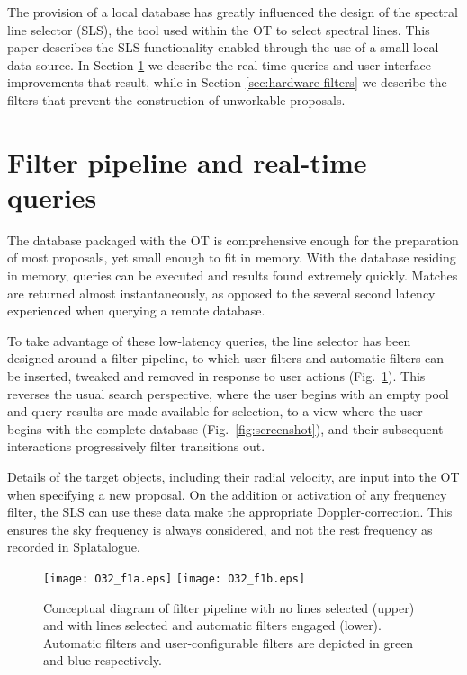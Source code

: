 \documentclass[11pt,twoside]{article}
\begin{document}
The provision of a local database has greatly influenced the design of the spectral line selector (SLS), the tool used within the OT to select spectral lines. This paper describes the SLS functionality enabled through the use of a small local data source. In Section \ref{sec:real-time queries}  we describe the real-time queries and user interface improvements that result, while in Section \ref{sec:hardware filters} we describe the filters that prevent the construction of unworkable proposals.

\section{Filter pipeline and real-time queries}
\label{sec:real-time queries}
The database packaged with the OT is comprehensive enough for the preparation of most proposals, yet small enough to fit in memory. With the database residing in memory, queries can be executed and results found extremely quickly. Matches are returned almost instantaneously, as opposed to the several second latency experienced when querying a remote database. 

To take advantage of these low-latency queries, the line selector has been designed around a filter pipeline, to which user filters and automatic filters can be inserted, tweaked and removed in response to user actions (Fig.~\ref{fig:pipeline}). This reverses the usual search perspective, where the user begins with an empty pool and query results are made available for selection, to a view where the user begins with the complete database (Fig.~\ref{fig:screenshot}), and their subsequent interactions progressively filter transitions out. 

Details of the target objects, including their radial velocity, are input into the OT when specifying a new proposal. On the addition or activation of any frequency filter, the SLS can use these data make the appropriate Doppler-correction. This ensures the sky frequency is always considered, and not the rest frequency as recorded in Splatalogue.

\begin{figure}
	\texttt{[image: O32\_f1a.eps]}
	\texttt{[image: O32\_f1b.eps]}
	\caption{Conceptual diagram of filter pipeline with no lines selected (upper) and with lines selected and automatic filters engaged (lower). Automatic filters and user-configurable filters are depicted in green and blue respectively.}
	\label{fig:pipeline}
\end{figure}
\end{document}
